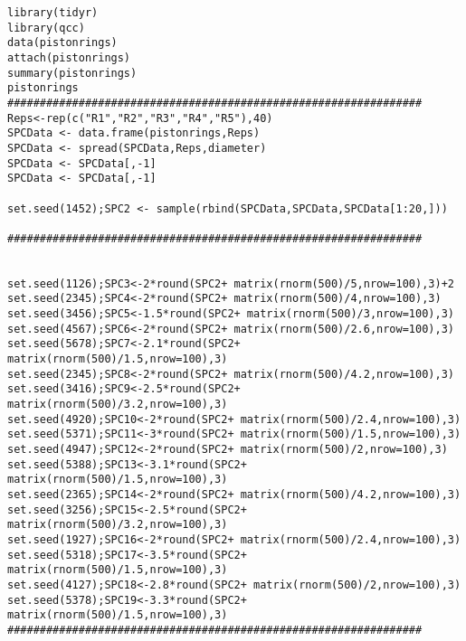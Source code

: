 \documentclass[a4paper,12pt]{article}
\begin{document}
\begin{verbatim}
library(tidyr)
library(qcc)
data(pistonrings)
attach(pistonrings)
summary(pistonrings)
pistonrings
################################################################
Reps<-rep(c("R1","R2","R3","R4","R5"),40)
SPCData <- data.frame(pistonrings,Reps)
SPCData <- spread(SPCData,Reps,diameter)
SPCData <- SPCData[,-1]
SPCData <- SPCData[,-1]

set.seed(1452);SPC2 <- sample(rbind(SPCData,SPCData,SPCData[1:20,]))

################################################################


set.seed(1126);SPC3<-2*round(SPC2+ matrix(rnorm(500)/5,nrow=100),3)+2
set.seed(2345);SPC4<-2*round(SPC2+ matrix(rnorm(500)/4,nrow=100),3)
set.seed(3456);SPC5<-1.5*round(SPC2+ matrix(rnorm(500)/3,nrow=100),3)
set.seed(4567);SPC6<-2*round(SPC2+ matrix(rnorm(500)/2.6,nrow=100),3)
set.seed(5678);SPC7<-2.1*round(SPC2+ matrix(rnorm(500)/1.5,nrow=100),3)
set.seed(2345);SPC8<-2*round(SPC2+ matrix(rnorm(500)/4.2,nrow=100),3)
set.seed(3416);SPC9<-2.5*round(SPC2+ matrix(rnorm(500)/3.2,nrow=100),3)
set.seed(4920);SPC10<-2*round(SPC2+ matrix(rnorm(500)/2.4,nrow=100),3)
set.seed(5371);SPC11<-3*round(SPC2+ matrix(rnorm(500)/1.5,nrow=100),3)
set.seed(4947);SPC12<-2*round(SPC2+ matrix(rnorm(500)/2,nrow=100),3)
set.seed(5388);SPC13<-3.1*round(SPC2+ matrix(rnorm(500)/1.5,nrow=100),3)
set.seed(2365);SPC14<-2*round(SPC2+ matrix(rnorm(500)/4.2,nrow=100),3)
set.seed(3256);SPC15<-2.5*round(SPC2+ matrix(rnorm(500)/3.2,nrow=100),3)
set.seed(1927);SPC16<-2*round(SPC2+ matrix(rnorm(500)/2.4,nrow=100),3)
set.seed(5318);SPC17<-3.5*round(SPC2+ matrix(rnorm(500)/1.5,nrow=100),3)
set.seed(4127);SPC18<-2.8*round(SPC2+ matrix(rnorm(500)/2,nrow=100),3)
set.seed(5378);SPC19<-3.3*round(SPC2+ matrix(rnorm(500)/1.5,nrow=100),3)
################################################################



\end{verbatim}
\end{document}

